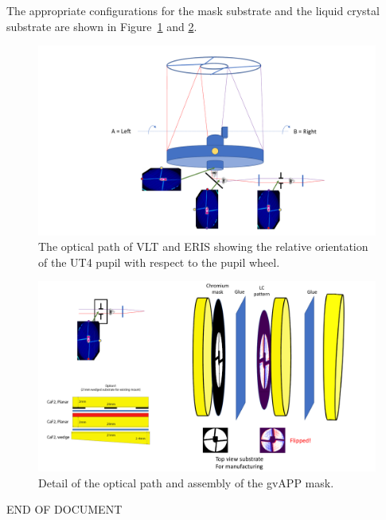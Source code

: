 \documentclass[a4paper,11pt]{article}
\begin{document}
The appropriate configurations for the mask substrate and the liquid
crystal substrate are shown in Figure~\ref{fig:vltmap1} and \ref{fig:vltmap2}.

\begin{figure}[htp]
\centering
\includegraphics[angle=0,width=\columnwidth]{app_layout_p1}
\caption{ \label{fig:vltmap1} The optical path of VLT and ERIS
showing the relative orientation of the UT4 pupil with respect to the
pupil wheel.}
\end{figure}

\begin{figure}[htp]
\centering
\includegraphics[angle=0,width=\columnwidth]{app_layout_p2}
\caption{ \label{fig:vltmap2} Detail of the optical path and assembly of
the gvAPP mask.}
\end{figure}






\centering
END OF DOCUMENT
\end{document}
